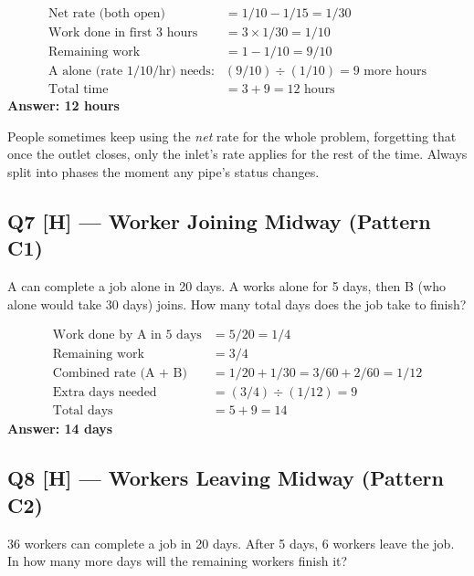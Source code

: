 \documentclass[11pt]{article}
\begin{document}
\begin{tipbox}[Solution]
\begin{align*}
\text{Net rate (both open)} &= 1/10 - 1/15 = 1/30 \\
\text{Work done in first 3 hours} &= 3 \times 1/30 = 1/10 \\
\text{Remaining work} &= 1 - 1/10 = 9/10 \\
\text{A alone (rate } 1/10\text{/hr) needs:} & (9/10) \div (1/10) = 9 \text{ more hours} \\
\text{Total time} &= 3 + 9 = 12 \text{ hours}
\end{align*}
\textbf{Answer: 12 hours}
\end{tipbox}

\begin{warnbox}
People sometimes keep using the \emph{net} rate for the whole problem, forgetting that once the
outlet closes, only the inlet's rate applies for the rest of the time. Always split into phases the
moment any pipe's status changes.
\end{warnbox}

\subsection*{Q7 [H] --- Worker Joining Midway (Pattern C1)}
A can complete a job alone in 20 days. A works alone for 5 days, then B (who alone would take 30
days) joins. How many total days does the job take to finish?

\begin{tipbox}[Solution]
\begin{align*}
\text{Work done by A in 5 days} &= 5/20 = 1/4 \\
\text{Remaining work} &= 3/4 \\
\text{Combined rate (A + B)} &= 1/20 + 1/30 = 3/60 + 2/60 = 1/12 \\
\text{Extra days needed} &= (3/4) \div (1/12) = 9 \\
\text{Total days} &= 5 + 9 = 14
\end{align*}
\textbf{Answer: 14 days}
\end{tipbox}

\subsection*{Q8 [H] --- Workers Leaving Midway (Pattern C2)}
36 workers can complete a job in 20 days. After 5 days, 6 workers leave the job. In how many more
days will the remaining workers finish it?
\end{document}
